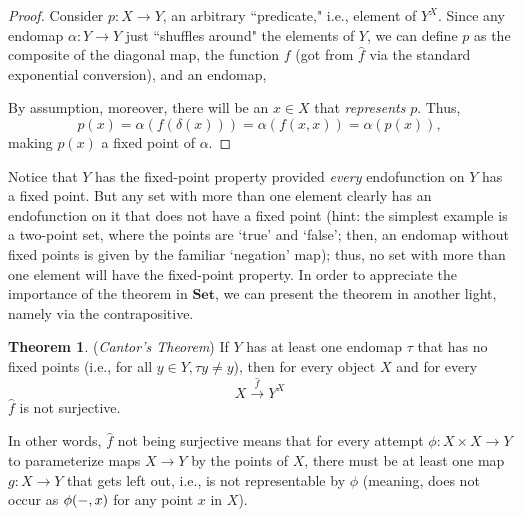 \documentclass[11pt]{book}
\theoremstyle{definition}
\theoremstyle{definition}
\theoremstyle{definition}
\newtheorem{theorem}{Theorem}[section]
\theoremstyle{theorem}
\theoremstyle{definition}
\begin{document}
\begin{proof}
	Consider $p: X \rightarrow Y$, an arbitrary ``predicate," i.e., element of $Y^X$. Since any endomap $\alpha: Y \rightarrow Y$ just ``shuffles around" the elements of $Y$, we can define $p$ as the composite of the diagonal map, the function $f$ (got from $\hat{f}$ via the standard exponential conversion), and an endomap, 
	\begin{center}
	\end{center}  
	By assumption, moreover, there will be an $x \in X$ that \textit{represents} $p$. Thus, 
	\begin{equation*}
	p(x) = \alpha(f(\delta(x))) = \alpha(f(x,x)) = \alpha(p(x)),
	\end{equation*}
	making $p(x)$ a fixed point of $\alpha$. 
\end{proof} \noindent 
Notice that $Y$ has the fixed-point property provided \textit{every} endofunction on $Y$ has a fixed point. But any set with more than one element clearly has an endofunction on it that does not have a fixed point (hint: the simplest example is a two-point set, where the points are `true' and `false'; then, an endomap without fixed points is given by the familiar `negation' map); thus, no set with more than one element will have the fixed-point property. In order to appreciate the importance of the theorem in $\textbf{Set}$, we can present the theorem in another light, namely via the contrapositive. 
\begin{theorem}
	(\textit{Cantor's Theorem}) If $Y$ has at least one endomap $\tau$ that has no fixed points (i.e., for all $y \in Y, \tau y \neq y$), then for every object $X$ and for every 
	\begin{equation*}
	X \xrightarrow{\hat{f}} Y^X 
	\end{equation*} 
	$\hat{f}$ is not surjective. \par 
	In other words, $\hat{f}$ not being surjective means that for every attempt $\phi: X \times X \rightarrow Y$ to parameterize maps $X \rightarrow Y$ by the points of $X$, there must be at least one map $g: X \rightarrow Y$ that gets left out, i.e., is not representable by $\phi$ (meaning, does not occur as $\phi(\--, x)$ for any point $x$ in $X$). 
\end{theorem}  
\end{document}
